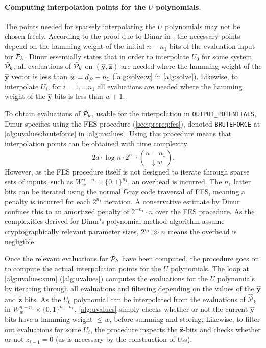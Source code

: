 \paragraph{Computing interpolation points for the $U$ polynomials.} The points needed for sparsely interpolating the $U$ polynomials may not be chosen freely. According to the proof due to Dinur in \cite{eurocrypt-2021-30841}, the necessary points depend on the hamming weight of the initial $n - n_1$ bits of the evaluation input for $\Tilde{\mathcal{P}}_k$. Dinur essentially states that in order to interpolate $U_0$ for some system $\Tilde{\mathcal{P}}_k$, all evaluations of $\Tilde{\mathcal{P}}_k$ on $(\hat{\mathbf{y}}, \hat{\mathbf{z}})$ are needed where the hamming weight of the $\hat{\mathbf{y}}$ vector is less than $w = d_{\Tilde{F}} - n_1$ (\cref{alg:solve:w} in \cref{alg:solve}). Likewise, to interpolate $U_i$, for $i = 1, \dots n_1$ all evaluations are needed where the hamming weight of the $\hat{\mathbf{y}}$-bits is less than $w + 1$.

To obtain evaluations of $\Tilde{\mathcal{P}}_k$, usable for the interpolation in \texttt{OUTPUT\_POTENTIALS}, Dinur specifies using the FES procedure (\cref{sec:prereq:fes}), denoted \texttt{BRUTEFORCE} at \cref{alg:uvalues:bruteforce} in \cref{alg:uvalues}. Using this procedure means that interpolation points can be obtained with time complexity 
$$
    2d \cdot \log n \cdot 2^{n_1} \cdot \binom{n - n_1}{\downarrow w}.
$$
However, as the FES procedure itself is not designed to iterate through sparse sets of inputs, such as $W^{n - n_1}_w \times \{0, 1\}^{n_1}$, an overhead is incurred. The $n_1$ latter bits can be iterated using the normal Gray code traversal of FES, meaning a penalty is incurred for each $2^{n_1}$ iteration. A conservative estimate by Dinur confines this to an amortized penalty of $2^{- n_1} \cdot n$ over the FES procedure. As the complexities derived for Dinur's polynomial method algorithm assume cryptographically relevant parameter sizes, $2^{n_1} \gg n$ means the overhead is negligible.

Once the relevant evaluations for $\Tilde{\mathcal{P}}_k$ have been computed, the procedure goes on to compute the actual interpolation points for the $U$ polynomials. The loop at \cref{alg:uvalues:sum} (\cref{alg:uvalues}) computes the evaluations for the $U$ polynomials by iterating through all evaluations and filtering depending on the values of the $\hat{\mathbf{y}}$ and $\hat{\mathbf{z}}$ bits. As the $U_0$ polynomial can be interpolated from the evaluations of $\hat{\mathcal{P}}_k$ in $W^{n - n_1}_w \times \{0, 1\}^{n - n_1}$, \cref{alg:uvalues} simply checks whether or not the current $\hat{\mathbf{y}}$ bits have a hamming weight $\leq w$, before summing and storing. Likewise, to filter out evaluations for some $U_i$, the procedure inspects the $\hat{\mathbf{z}}$-bits and checks whether or not $z_{i - 1} = 0$ (as is necessary by the construction of $U_i$s).

